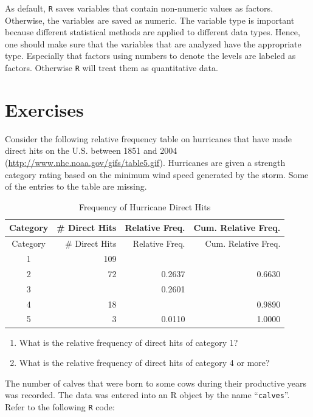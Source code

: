 \documentclass[]{krantz}
\theoremstyle{definition}
\theoremstyle{definition}
\theoremstyle{definition}
\theoremstyle{remark}
\let\BeginKnitrBlock\begin \let\EndKnitrBlock\end
\begin{document}
As default, \texttt{R} saves variables that contain non-numeric values
as factors. Otherwise, the variables are saved as numeric. The variable
type is important because different statistical methods are applied to
different data types. Hence, one should make sure that the variables
that are analyzed have the appropriate type. Especially that factors
using numbers to denote the levels are labeled as factors. Otherwise
\texttt{R} will treat them as quantitative data.

\section{Exercises}\label{exercises-1}

\BeginKnitrBlock{exercise}
\protect\hypertarget{exr:unnamed-chunk-19}{}{\label{exr:unnamed-chunk-19}
}Consider the following relative frequency table on hurricanes that have
made direct hits on the U.S. between 1851 and 2004
(\url{http://www.nhc.noaa.gov/gifs/table5.gif}). Hurricanes are given a
strength category rating based on the minimum wind speed generated by
the storm. Some of the entries to the table are missing.

\begin{longtable}[]{@{}crrr@{}}
\caption{Frequency of Hurricane Direct Hits}\tabularnewline
\toprule
Category & \# Direct Hits & Relative Freq. & Cum. Relative
Freq.\tabularnewline
\midrule
\endfirsthead
\toprule
Category & \# Direct Hits & Relative Freq. & Cum. Relative
Freq.\tabularnewline
\midrule
\endhead
1 & 109 & &\tabularnewline
2 & 72 & 0.2637 & 0.6630\tabularnewline
3 & & 0.2601 &\tabularnewline
4 & 18 & & 0.9890\tabularnewline
5 & 3 & 0.0110 & 1.0000\tabularnewline
\bottomrule
\end{longtable}

\begin{enumerate}
\def\labelenumi{\arabic{enumi}.}
\item
  What is the relative frequency of direct hits of category 1?
\item
  What is the relative frequency of direct hits of category 4 or more?
\end{enumerate}
\EndKnitrBlock{exercise}

\BeginKnitrBlock{exercise}
\protect\hypertarget{exr:unnamed-chunk-20}{}{\label{exr:unnamed-chunk-20}
}The number of calves that were born to some cows during their
productive years was recorded. The data was entered into an R object by
the name ``\texttt{calves}''. Refer to the following \texttt{R} code:
\EndKnitrBlock{exercise}
\end{document}
